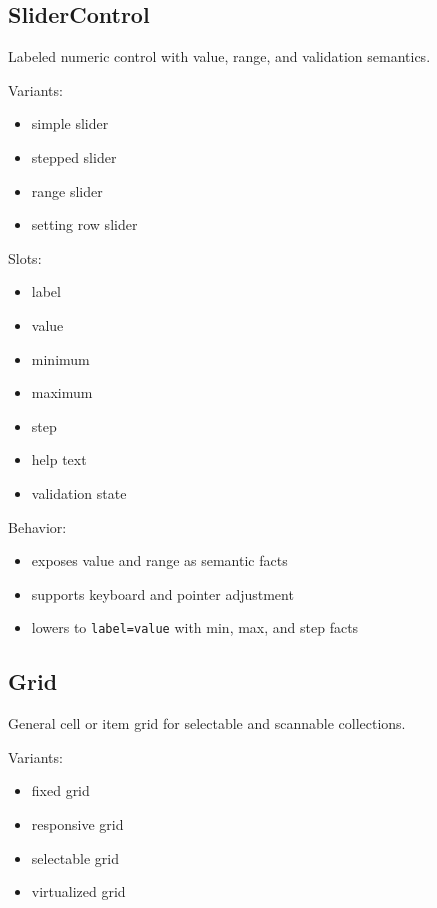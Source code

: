 \subsection{SliderControl}\label{record-128-slidercontrol}

Labeled numeric control with value, range, and validation semantics.

Variants:

\begin{itemize}
\tightlist
\item
  simple slider
\item
  stepped slider
\item
  range slider
\item
  setting row slider
\end{itemize}

Slots:

\begin{itemize}
\tightlist
\item
  label
\item
  value
\item
  minimum
\item
  maximum
\item
  step
\item
  help text
\item
  validation state
\end{itemize}

Behavior:

\begin{itemize}
\tightlist
\item
  exposes value and range as semantic facts
\item
  supports keyboard and pointer adjustment
\item
  lowers to \texttt{l\allowbreak{}a\allowbreak{}b\allowbreak{}e\allowbreak{}l\allowbreak{}=\allowbreak{}v\allowbreak{}a\allowbreak{}l\allowbreak{}u\allowbreak{}e} with min, max, and step facts
\end{itemize}

\subsection{Grid}\label{record-128-grid}

General cell or item grid for selectable and scannable collections.

Variants:

\begin{itemize}
\tightlist
\item
  fixed grid
\item
  responsive grid
\item
  selectable grid
\item
  virtualized grid
\end{itemize}

